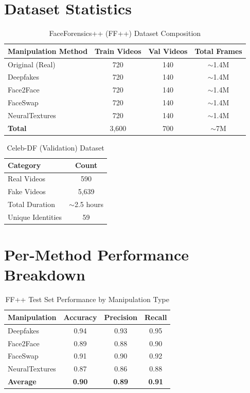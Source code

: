 \documentclass[11pt,a4paper]{article}
\begin{document}
\section{Dataset Statistics}

\begin{table}[h]
\centering
\caption{FaceForensics++ (FF++) Dataset Composition}
\begin{tabular}{lccc}
\toprule
\textbf{Manipulation Method} & \textbf{Train Videos} & \textbf{Val Videos} & \textbf{Total Frames} \\
\midrule
Original (Real) & 720 & 140 & $\sim$1.4M \\
Deepfakes & 720 & 140 & $\sim$1.4M \\
Face2Face & 720 & 140 & $\sim$1.4M \\
FaceSwap & 720 & 140 & $\sim$1.4M \\
NeuralTextures & 720 & 140 & $\sim$1.4M \\
\midrule
\textbf{Total} & 3,600 & 700 & $\sim$7M \\
\bottomrule
\end{tabular}
\end{table}

\begin{table}[h]
\centering
\caption{Celeb-DF (Validation) Dataset}
\begin{tabular}{lc}
\toprule
\textbf{Category} & \textbf{Count} \\
\midrule
Real Videos & 590 \\
Fake Videos & 5,639 \\
Total Duration & $\sim$2.5 hours \\
Unique Identities & 59 \\
\bottomrule
\end{tabular}
\end{table}

\section{Per-Method Performance Breakdown}

\begin{table}[h]
\centering
\caption{FF++ Test Set Performance by Manipulation Type}
\label{tab:per-method}
\begin{tabular}{lccc}
\toprule
\textbf{Manipulation} & \textbf{Accuracy} & \textbf{Precision} & \textbf{Recall} \\
\midrule
Deepfakes & 0.94 & 0.93 & 0.95 \\
Face2Face & 0.89 & 0.88 & 0.90 \\
FaceSwap & 0.91 & 0.90 & 0.92 \\
NeuralTextures & 0.87 & 0.86 & 0.88 \\
\midrule
\textbf{Average} & \textbf{0.90} & \textbf{0.89} & \textbf{0.91} \\
\bottomrule
\end{tabular}
\end{table}
\end{document}
